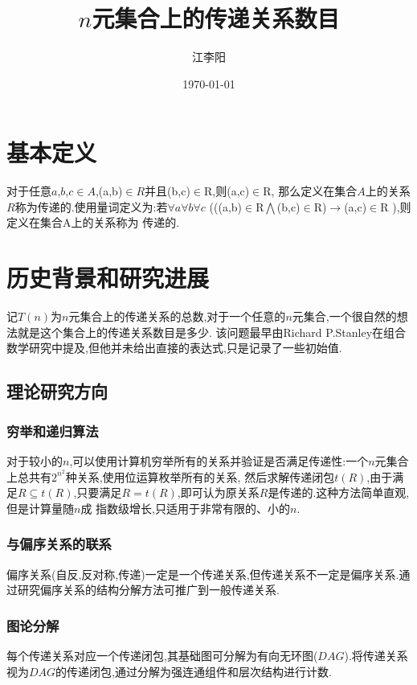 \documentclass[12pt]{article}
\title{$n$元集合上的传递关系数目}
\author{江李阳}
\date{\today}
\theoremstyle{definition}
\begin{document}
\maketitle
\tableofcontents

\section{基本定义}
对于任意$a$,$b$,$c$$\in$$A$,(a,b)$\in$$R$并且(b,c)$\in$R,则(a,c)$\in$R,
那么定义在集合$A$上的关系$R$称为传递的.使用量词定义为:若$\forall a$$\forall b$$\forall c$ 
(((a,b)$\in$R$\bigwedge$(b,c)$\in$R)$\rightarrow $(a,c)$\in$R ),则定义在集合A上的关系称为
传递的.
\section{历史背景和研究进展}
记$T(n)$为$n$元集合上的传递关系的总数,对于一个任意的$n$元集合,一个很自然的想法就是这个集合上的传递关系数目是多少.
该问题最早由Richard P.Stanley在组合数学研究中提及,但他并未给出直接的表达式,只是记录了一些初始值.
\subsection{理论研究方向}
\subsubsection{穷举和递归算法}
对于较小的$n$,可以使用计算机穷举所有的关系并验证是否满足传递性:一个$n$元集合上总共有$2^{n^{2}}$种关系,使用位运算枚举所有的关系,
然后求解传递闭包$t(R)$,由于满足$R\subseteq t(R)$,只要满足$R=t(R)$,即可认为原关系$R$是传递的.这种方法简单直观,但是计算量随$n$成
指数级增长,只适用于非常有限的、小的$n$.
\subsubsection{与偏序关系的联系}
偏序关系(自反,反对称,传递)一定是一个传递关系,但传递关系不一定是偏序关系.通过研究偏序关系的结构分解方法可推广到一般传递关系.
\subsubsection{图论分解}
每个传递关系对应一个传递闭包,其基础图可分解为有向无环图($DAG$).将传递关系视为$DAG$的传递闭包,通过分解为强连通组件和层次结构进行计数.
\end{document}
